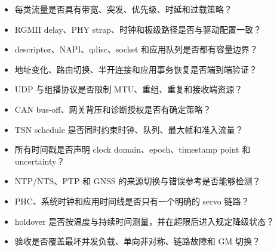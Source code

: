 \begin{itemize}
  \item 每类流量是否具有带宽、突发、优先级、时延和过载策略？
  \item RGMII delay、PHY strap、时钟和板级路径是否与驱动配置一致？
  \item descriptor、NAPI、qdisc、socket 和应用队列是否都有容量边界？
  \item 地址变化、路由切换、半开连接和应用事务恢复是否端到端验证？
  \item UDP 与组播协议是否限制 MTU、重组、重复和接收端资源？
  \item CAN bus-off、网关背压和诊断授权是否有确定策略？
  \item TSN schedule 是否同时约束时钟、队列、最大帧和准入流量？
  \item 所有时间戳是否声明 clock domain、epoch、timestamp point 和 uncertainty？
  \item NTP/NTS、PTP 和 GNSS 的来源切换与错误参考是否能够检测？
  \item PHC、系统时钟和应用时间线是否只有一个明确的 servo 链路？
  \item holdover 是否按温度与持续时间测量，并在超限后进入规定降级状态？
  \item 验收是否覆盖最坏并发负载、单向非对称、链路故障和 GM 切换？
\end{itemize}
